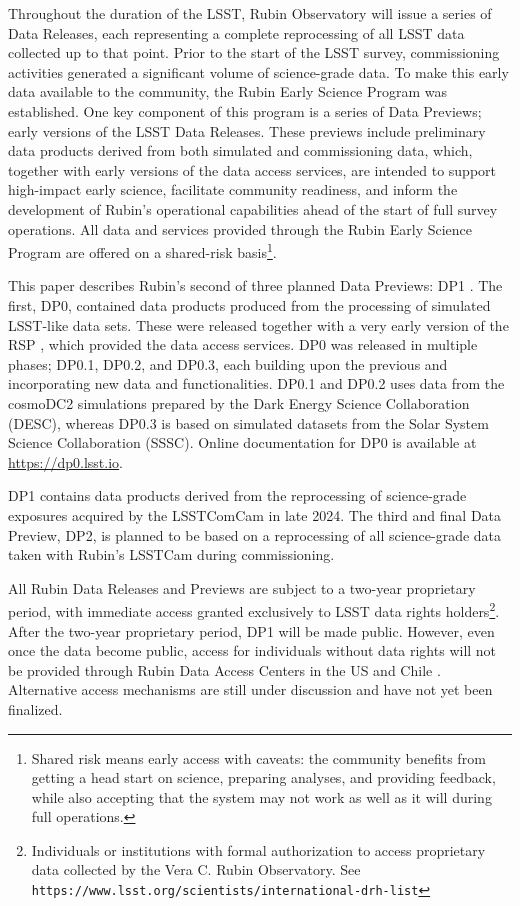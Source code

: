 Throughout the duration of the \gls{LSST},  Rubin Observatory will issue a series of Data Releases, each representing a complete reprocessing of all \gls{LSST} data collected up to that point.
Prior to the start of the \gls{LSST} survey, commissioning activities generated a significant volume of science-grade data.
To make this early data available to the community, the Rubin Early Science Program \citep{RTN-011} was established.
One key component of this program is a series of Data Previews; early versions of the \gls{LSST} Data Releases.
These previews include preliminary data products derived from both simulated and commissioning data, which, together with early versions of the data access services, are intended to support high-impact early science, facilitate community readiness, and inform the development of Rubin’s operational capabilities ahead of the start of full survey operations.
All data and services provided through the Rubin Early Science Program are offered on a shared-risk basis\footnote{Shared risk means early access with caveats: the community benefits from getting a head start on science, preparing analyses, and providing feedback, while also accepting that the system may not work as well as it will during full operations.}.

This paper describes Rubin's second of three planned Data Previews: \gls{DP1} \citep[][]{10.71929/rubin/2570308}.
The first, \gls{DP0}, contained data products produced from the processing of simulated \gls{LSST}-like data sets.
These were released together with a very early version of the \gls{RSP} \citep{LSE-319}, which provided the data access services.
\gls{DP0} was released in multiple phases; DP0.1, DP0.2, and DP0.3,  each building upon the previous and incorporating new data and functionalities.
DP0.1 and DP0.2 uses data from the cosmoDC2 simulations \citep[][]{2021ApJS..253...31L} prepared by the Dark Energy Science Collaboration (DESC), whereas DP0.3 is based on simulated datasets from the Solar System Science Collaboration (SSSC).
Online documentation for \gls{DP0} is available at \url{https://dp0.lsst.io}.
 
\gls{DP1} contains data products derived from the reprocessing of science-grade exposures acquired by the \gls{LSSTComCam} in late 2024.
The third and final Data Preview, \gls{DP2}, is planned to be based on a reprocessing of all science-grade data taken with Rubin's \gls{LSSTCam} during commissioning.

All Rubin Data Releases and Previews are subject to a two-year proprietary period, with immediate access granted exclusively to LSST data rights holders\footnote{Individuals or institutions with formal authorization to access proprietary data collected by the Vera C. Rubin Observatory. See \nolinkurl{https://www.lsst.org/scientists/international-drh-list}}\citep[][]{rdo-013}.
After the two-year proprietary period, \gls{DP1} will be made public. 
However, even once the data become public, access for individuals without data rights will not be provided through Rubin Data Access Centers  in the US and Chile \citep[][]{rdo-013}. 
Alternative access mechanisms are still under discussion and have not yet been finalized.

